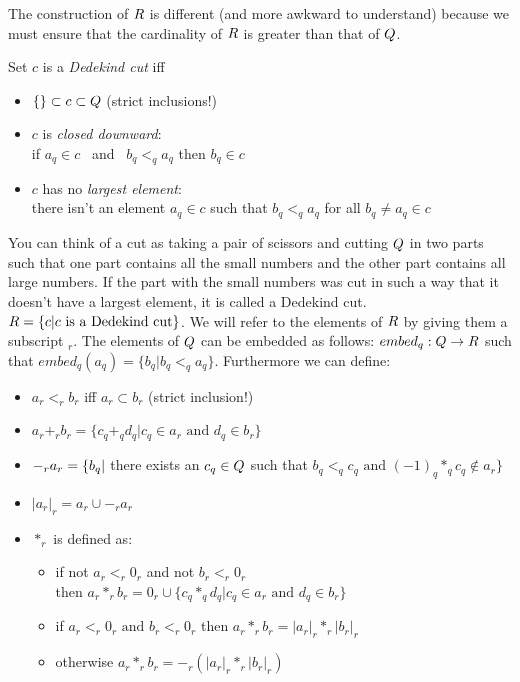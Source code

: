 The construction of $R$ is different (and more awkward to understand)
because we must ensure that the cardinality of $R$ is greater than that
of $Q$.

Set $c$ is a {\em Dedekind cut} iff
\begin{itemize}
  \item $\{\} \subset c \subset Q$ (strict inclusions!)
  \item $c$ is {\em closed downward}: \\
  if $a_q \in c$ \mbox{ and } $b_q <_q a_q$ then $b_q \in c$
  \item $c$ has no {\em largest element}: \\
      there isn't an element $a_q \in c$ such that $b_q <_q a_q$ for all $b_q
      \neq a_q \in c$
\end{itemize}

You can think of a cut as taking a pair of scissors and cutting $Q$ in
two parts such that one part contains all the small numbers and the
other part contains all large numbers. If the part with the small
numbers was cut in such a way that it doesn't have a largest element, it
is called a Dedekind cut.  $R = \{c | c \mbox{ is a Dedekind
  cut}\}$. We will refer to the elements of $R$ by giving them a
subscript $_r$. The elements of $Q$ can be embedded as follows:
$embed_q: Q \rightarrow R$ such that $embed_q(a_q) = \{b_q | b_q <_q
a_q\}$. Furthermore we can define:

\begin{itemize}
  \item $a_r <_r b_r$ iff $a_r \subset b_r$ (strict inclusion!)
  \item $a_r +_r b_r = \{c_q +_q d_q | c_q \in a_r \mbox{ and } d_q \in b_r\}$
  \item $-_r a_r = \\
  \{b_q |$ there exists an $c_q \in Q$ such that $b_q <_q c_q \mbox{ and
  } (-1)_q *_q c_q \not\in a_r\}$
  \item $|a_r|_r = a_r \cup -_r a_r$
  \item $*_r$ is defined as:
  \begin{itemize}
    \item if not $a_r <_r 0_r$ and not $b_r <_r 0_r$ \\ then $a_r *_r b_r =
            0_r \cup \{c_q *_q d_q | c_q \in a_r \mbox{ and } d_q \in b_r\}$
    \item if $a_r <_r 0_r \mbox{ and } b_r <_r 0_r$ then $a_r *_r b_r =
            |a_r|_r *_r |b_r|_r$
    \item otherwise $a_r *_r b_r = -_r (|a_r|_r *_r |b_r|_r)$
  \end{itemize}
\end{itemize}

